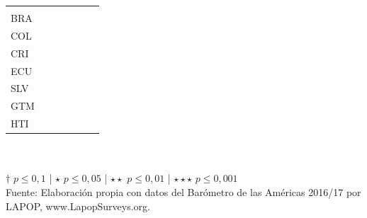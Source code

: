 \documentclass[a4paper]{tufte-handout}
\begin{document}
\begin{table}[h]
\begin{tabular}{l c c c c c c}
    & & & & & & \\
    \multirow{2}{*}{BRA} & & & & & & \\
    & & & & & & \\
    \multirow{2}{*}{COL} & & & & & & \\
    & & & & & & \\
    \multirow{2}{*}{CRI} & & & & & & \\
    & & & & & & \\
    \multirow{2}{*}{ECU} & & & & & & \\
    & & & & & & \\
    \multirow{2}{*}{SLV} & & & & & & \\
    & & & & & & \\
    \multirow{2}{*}{GTM} & & & & & & \\
    & & & & & & \\
    \multirow{2}{*}{HTI} & & & & & & \\
    & & & & & & \\ \bottomrule
  \end{tabular}
  \\~\\ \smallskip\noindent\scriptsize $\dagger$ $p \leq 0,1$ | $\star$ $p \leq 0,05$ | $\star\star$ $p \leq 0,01$ | $\star\star\star$ $p \leq 0,001$  \\ Fuente: Elaboración propia con datos del Barómetro de las Américas 2016/17 por LAPOP, www.LapopSurveys.org. 
\end{table}
\end{document}
